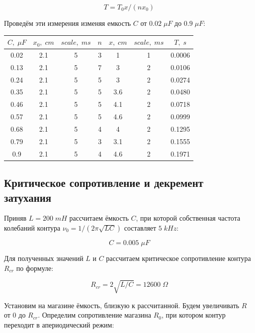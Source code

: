 \documentclass{article}
\begin{document}
\[ T = T_0x/(nx_0) \]

Проведём эти измерения изменяя емкость \( C \) от \( 0.02\; \mu F \) до \( 0.9\; \mu F \):

\begin{table}[H]
    \centering
    \label{table:T}
    \begin{tabular}{|c|c|c|c|c|c|c|}
    \hline
    \(C,\; \mu F \) & \(x_0,\; cm\) & \(scale,\; ms\) & \(n\) & \(x,\; cm\) & \(scale,\; ms\)& \(T,\; s\) \\\hline
    0.02   & 2.1    & 5         & 3 & 1     & 1         & 0.0006 \\\hline
    0.13   & 2.1    & 5         & 7 & 3     & 2         & 0.0106 \\\hline
    0.24   & 2.1    & 5         & 5 & 3     & 2         & 0.0274 \\\hline
    0.35   & 2.1    & 5         & 5 & 3.6   & 2         & 0.0480 \\\hline
    0.46   & 2.1    & 5         & 5 & 4.1   & 2         & 0.0718 \\\hline
    0.57   & 2.1    & 5         & 5 & 4.6   & 2         & 0.0999 \\\hline
    0.68   & 2.1    & 5         & 4 & 4     & 2         & 0.1295 \\\hline
    0.79   & 2.1    & 5         & 3 & 3.1   & 2         & 0.1555 \\\hline
    0.9    & 2.1    & 5         & 4 & 4.6   & 2         & 0.1971 \\\hline
    \end{tabular}
\end{table}

\subsection{Критическое сопротивление и декремент затухания} \label{sec:Rcr}
Приняв \( L = 200\; mH \) рассчитаем ёмкость \( C \), при которой собственная частота колебаний контура 
\( \nu_0 = 1/(2\pi\sqrt{LC}) \) составляет \( 5\; kHz \):

\[ C = 0.005\; \mu F \]

Для полученных значений \( L \) и \( C \) рассчитаем критическое сопротивление контура \( R_{cr} \) по формуле:

\[ R_{cr} = 2\sqrt{L/C} = 12600\; \Omega \]

Установим на магазине ёмкость, близкую к рассчитанной. Будем увеличивать \( R \) от \( 0 \) до \( R_{cr} \). Определим
сопротивление магазина \( R_0 \), при котором контур переходит в апериодический режим:
\end{document}
